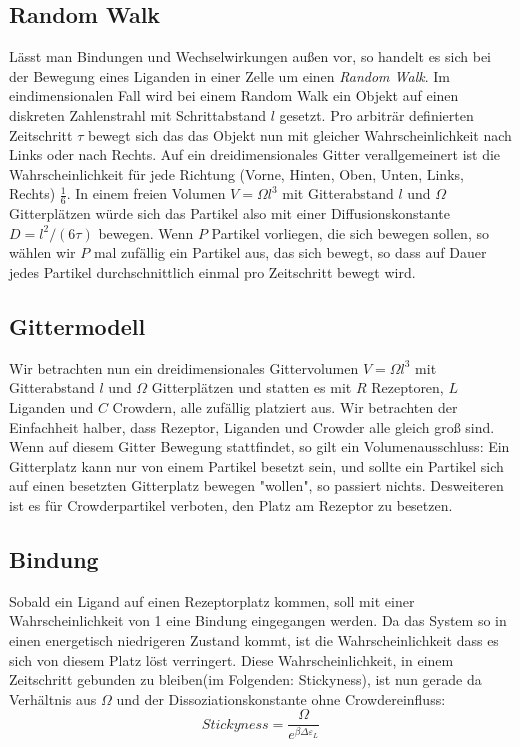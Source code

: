 \documentclass[bachelor,       %
               twoside,        %
               BCOR10mm,       %
               english,ngerman, %
               ]{GAUBM}
\begin{document}
\subsection{Random Walk}
Lässt man Bindungen und Wechselwirkungen außen vor, so handelt es sich bei der
Bewegung eines Liganden in einer Zelle um einen \emph{Random Walk}.
Im eindimensionalen Fall wird bei einem Random Walk ein Objekt auf
einen diskreten Zahlenstrahl mit Schrittabstand $l$ gesetzt.
Pro arbiträr definierten Zeitschritt $\tau$ bewegt sich das das Objekt nun mit gleicher Wahrscheinlichkeit
nach Links oder nach Rechts. Auf ein dreidimensionales Gitter verallgemeinert ist die Wahrscheinlichkeit
für jede Richtung (Vorne, Hinten, Oben, Unten, Links, Rechts) $\frac{1}{6}$.
In einem freien Volumen $V = \Omega l^3$ mit Gitterabstand $l$ und $\Omega$ Gitterplätzen
würde sich das Partikel also mit einer Diffusionskonstante $D = l^2 / (6\tau)$ bewegen.
Wenn $P$ Partikel vorliegen, die sich bewegen sollen, so wählen wir $P$ mal zufällig ein Partikel aus,
das sich bewegt, so dass auf Dauer jedes Partikel durchschnittlich einmal pro Zeitschritt bewegt wird.

\subsection{Gittermodell}
Wir betrachten nun ein dreidimensionales Gittervolumen
$V = \Omega l^3$ mit Gitterabstand $l$ und $\Omega$ Gitterplätzen und statten es mit
$R$ Rezeptoren, $L$ Liganden und $C$ Crowdern, alle zufällig platziert aus.
Wir betrachten der Einfachheit halber, dass Rezeptor, Liganden und Crowder alle gleich groß sind.
Wenn auf diesem Gitter Bewegung stattfindet, so gilt ein Volumenausschluss: Ein Gitterplatz kann nur
von einem Partikel besetzt sein, und sollte ein Partikel sich auf einen besetzten Gitterplatz bewegen
"wollen", so passiert nichts. Desweiteren ist es für Crowderpartikel verboten, den Platz am Rezeptor zu
besetzen.
\subsection{Bindung}
Sobald ein Ligand auf einen Rezeptorplatz kommen, soll mit einer Wahrscheinlichkeit von
1 eine Bindung eingegangen werden. Da das System so in einen energetisch niedrigeren
Zustand kommt, ist die Wahrscheinlichkeit dass es sich von diesem Platz löst verringert.
Diese  Wahrscheinlichkeit, in einem Zeitschritt gebunden zu bleiben(im Folgenden: Stickyness), ist nun gerade da Verhältnis aus $\Omega$ und der Dissoziationskonstante ohne Crowdereinfluss:
\begin{equation}
Stickyness = \frac{\Omega}{e^{\beta\Delta\varepsilon_L}}
\end{equation}
\end{document}
